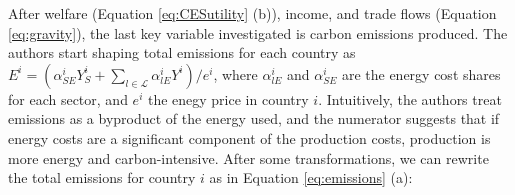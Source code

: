 
After welfare (Equation \ref{eq:CESutility} (b)), income, and trade flows (Equation \ref{eq:gravity}), the last key variable investigated is carbon emissions produced. The authors start shaping total emissions for each country as $E^i=(\alpha_{SE}^iY_S^i+\sum_{l\in\mathcal{L}}\alpha_{lE}^iY^i)/e^i$, where $\alpha_{lE}^i$ and $\alpha_{SE}^i$ are the energy cost shares for each sector, and $e^i$ the enegy price in country $i$. Intuitively, the authors treat emissions as a byproduct of the energy used, and the numerator suggests that if energy costs are a significant component of the production costs, production is more energy and carbon-intensive. After some transformations, we can rewrite the total emissions for country $i$  as in Equation \ref{eq:emissions} (a):

